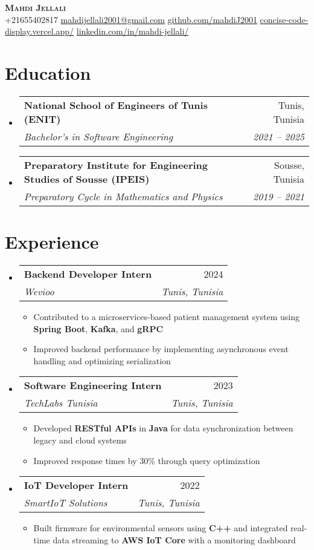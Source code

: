 \documentclass[letterpaper,11pt]{article}
\makeatletter
\newcommand{\resumeItem}[1]{
    \item\small{
            {#1 \vspace{-2pt}}
    }
}
\newcommand{\resumeSubheading}[4]{
    \vspace{-2pt}\item
    \begin{tabular*}{0.97\textwidth}[t]{l@{\extracolsep{\fill}}r}
    \textbf{#1} & #2 \\
    \textit{\small#3} & \textit{\small #4} \\
    \end{tabular*}\vspace{-7pt}
}
\newcommand{\resumeSubHeadingListStart}{\begin{itemize}[leftmargin=0.15in, label={}]}
\newcommand{\resumeSubHeadingListEnd}{\end{itemize}}
\newcommand{\resumeItemListStart}{\begin{itemize}}
\newcommand{\resumeItemListEnd}{\end{itemize}\vspace{-5pt}}
\makeatother
\begin{document}
\begin{center}
\textbf{\Huge \scshape Mahdi Jellali} \\ \vspace{1pt}
\small
+21655402817 \quad
\href{mailto:mahdijellali2001@gmail.com}{mahdijellali2001@gmail.com} \quad
\href{https://github.com/mahdiJ2001}{github.com/mahdiJ2001} \quad
\href{https://concise-code-display.vercel.app/}{concise-code-display.vercel.app/} \quad
\href{https://www.linkedin.com/in/mahdi-jellali/}{linkedin.com/in/mahdi-jellali/}
\end{center}

\vspace{10pt}
\section{Education}
\resumeSubHeadingListStart
\resumeSubheading
{National School of Engineers of Tunis (ENIT)}{Tunis, Tunisia}
{Bachelor’s in Software Engineering}{2021 -- 2025}
\resumeSubheading
{Preparatory Institute for Engineering Studies of Sousse (IPEIS)}{Sousse, Tunisia}
{Preparatory Cycle in Mathematics and Physics}{2019 -- 2021}
\resumeSubHeadingListEnd

\section{Experience}
\resumeSubHeadingListStart
\resumeSubheading
{Backend Developer Intern}{2024}
{Wevioo}{Tunis, Tunisia}
\resumeItemListStart
\resumeItem{Contributed to a microservices-based patient management system using \textbf{Spring Boot}, \textbf{Kafka}, and \textbf{gRPC}}
\resumeItem{Improved backend performance by implementing asynchronous event handling and optimizing serialization}
\resumeItemListEnd
\resumeSubheading
{Software Engineering Intern}{2023}
{TechLabs Tunisia}{Tunis, Tunisia}
\resumeItemListStart
\resumeItem{Developed \textbf{RESTful APIs} in \textbf{Java} for data synchronization between legacy and cloud systems}
\resumeItem{Improved response times by 30\% through query optimization}
\resumeItemListEnd
\resumeSubheading
{IoT Developer Intern}{2022}
{SmartIoT Solutions}{Tunis, Tunisia}
\resumeItemListStart
\resumeItem{Built firmware for environmental sensors using \textbf{C++} and integrated real-time data streaming to \textbf{AWS IoT Core} with a monitoring dashboard}
\resumeItemListEnd
\resumeSubHeadingListEnd

\end{document}
